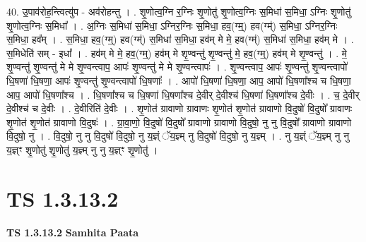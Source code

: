 \documentclass[17pt]{extarticle}
\begin{document}
40. उ॒पाव॑रोह॒न्त्वित्यु॑प - अव॑रोहन्तु । . शृ॒णोत्व॒ग्नि र॒ग्निः शृ॒णोतु॑ शृ॒णोत्व॒ग्निः स॒मिधा॑ स॒मिधा॒ ऽग्निः शृ॒णोतु॑ शृ॒णोत्व॒ग्निः स॒मिधा᳚ । . अ॒ग्निः स॒मिधा॑ स॒मिधा॒ ऽग्निर॒ग्निः स॒मिधा॒ हव॒(ग्म्॒) हव(ग्म्॑) स॒मिधा॒ ऽग्निर॒ग्निः स॒मिधा॒ हव᳚म् । . स॒मिधा॒ हव॒(ग्म्॒) हव(ग्म्॑) स॒मिधा॑ स॒मिधा॒ हव॑म् मे मे॒ हव(ग्म्॑) स॒मिधा॑ स॒मिधा॒ हव॑म् मे । . स॒मिधेति॑ सम् - इधा᳚ । . हव॑म् मे मे॒ हव॒(ग्म्॒) हव॑म् मे शृ॒ण्वन्तु॑ शृ॒ण्वन्तु॑ मे॒ हव॒(ग्म्॒) हव॑म् मे शृ॒ण्वन्तु॑ । . मे॒ शृ॒ण्वन्तु॑ शृ॒ण्वन्तु॑ मे मे शृ॒ण्वन्त्वाप॒ आपः॑ शृ॒ण्वन्तु॑ मे मे शृ॒ण्वन्त्वापः॑ । . शृ॒ण्वन्त्वाप॒ आपः॑ शृ॒ण्वन्तु॑ शृ॒ण्वन्त्वापो॑ धि॒षणा॑ धि॒षणा॒ आपः॑ शृ॒ण्वन्तु॑ शृ॒ण्वन्त्वापो॑ धि॒षणाः᳚ । . आपो॑ धि॒षणा॑ धि॒षणा॒ आप॒ आपो॑ धि॒षणा᳚श्च च धि॒षणा॒ आप॒ आपो॑ धि॒षणा᳚श्च । . धि॒षणा᳚श्च च धि॒षणा॑ धि॒षणा᳚श्च दे॒वीर् दे॒वीश्च॑ धि॒षणा॑ धि॒षणा᳚श्च दे॒वीः । . च॒ दे॒वीर् दे॒वीश्च॑ च दे॒वीः । . दे॒वीरिति॑ दे॒वीः । . शृ॒णोत॑ ग्रावाणो ग्रावाणः शृ॒णोत॑ शृ॒णोत॑ ग्रावाणो वि॒दुषो॑ वि॒दुषो᳚ ग्रावाणः शृ॒णोत॑ शृ॒णोत॑ ग्रावाणो वि॒दुषः॑ । . ग्रा॒वा॒णो॒ वि॒दुषो॑ वि॒दुषो᳚ ग्रावाणो ग्रावाणो वि॒दुषो॒ नु नु वि॒दुषो᳚ ग्रावाणो ग्रावाणो वि॒दुषो॒ नु । . वि॒दुषो॒ नु नु वि॒दुषो॑ वि॒दुषो॒ नु य॒ज्ञ्ं ॅय॒ज्ञ्म् नु वि॒दुषो॑ वि॒दुषो॒ नु य॒ज्ञ्म् । . नु य॒ज्ञ्ं ॅय॒ज्ञ्म् नु नु य॒ज्ञ्ꣳ शृ॒णोतु॑ शृ॒णोतु॑ य॒ज्ञ्म् नु नु य॒ज्ञ्ꣳ शृ॒णोतु॑ । \newline
\pagebreak
{}

\section{ TS 1.3.13.2 }

\textbf{TS 1.3.13.2 } \newline
\textbf{Samhita Paata} \newline
\end{document}
